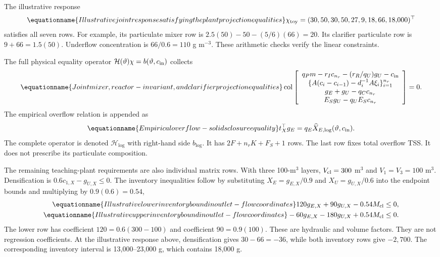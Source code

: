 The illustrative response
\begin{equation}
\equationname{Illustrative joint response satisfying the plant projection equalities}
\chi_{\rm toy}=(30,50,30,50,27,9,18,66,18{,}000)^\top
\end{equation}
satisfies all seven rows. For example, its particulate mixer row is $2.5(50)-50-(5/6)(66)=20$. Its clarifier particulate row is $9+66=1.5(50)$. Underflow concentration is $66/0.6=110$ g m$^{-3}$. These arithmetic checks verify the linear constraints.

The full physical equality operator $\mathcal H(\vartheta)\chi=b(\vartheta,c_{\rm in})$ collects
\begin{equation}
\equationname{Joint mixer, reactor-invariant, and clarifier projection equalities}
\operatorname{col}\left[
\begin{array}{c}
q_Pm-r_Ic_{n_r}-(r_R/q_U)g_U-c_{\rm in}\\
\{A(c_i-c_{i-1})-d_i^{-1}A\xi_i\}_{i=1}^{n_r}\\
g_E+g_U-q_Cc_{n_r}\\
E_Sg_U-q_UE_Sc_{n_r}
\end{array}\right]=0.
\label{eq:plant_projection_equalities}
\end{equation}
The empirical overflow relation is appended as
\begin{equation}
\equationname{Empirical overflow-solids closure equality}
t_X^\top g_E=q_E\widehat X_{E,\log}(\vartheta,c_{\rm in}).
\label{eq:plant_overflow_closure}
\end{equation}
The complete operator is denoted $\mathcal H_{\log}$ with right-hand side $b_{\log}$. It has $2F+n_rK+F_S+1$ rows. The last row fixes total overflow TSS. It does not prescribe its particulate composition.

The remaining teaching-plant requirements are also individual matrix rows. With three 100-m$^3$ layers, $V_{\rm cl}=300$ m$^3$ and $V_1=V_3=100$ m$^3$. Densification is $0.6c_{1,X}-g_{U,X}\le0$. The inventory inequalities follow by substituting $X_E=g_{E,X}/0.9$ and $X_U=g_{U,X}/0.6$ into the endpoint bounds and multiplying by $0.9(0.6)=0.54$,
\begin{align}
\equationname{Illustrative lower inventory bound in outlet-flow coordinates}
120g_{E,X}+90g_{U,X}-0.54M_{\rm cl}&\le0,\\
\equationname{Illustrative upper inventory bound in outlet-flow coordinates}
-60g_{E,X}-180g_{U,X}+0.54M_{\rm cl}&\le0.
\end{align}
The lower row has coefficient $120=0.6(300-100)$ and coefficient $90=0.9(100)$. These are hydraulic and volume factors. They are not regression coefficients. At the illustrative response above, densification gives $30-66=-36$, while both inventory rows give $-2{,}700$. The corresponding inventory interval is 13{,}000--23{,}000 g, which contains 18{,}000 g.


